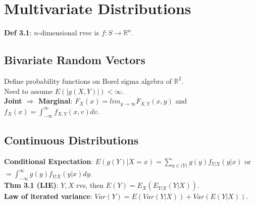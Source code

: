 \section{Multivariate Distributions}
\textbf{Def 3.1}: $n$-dimensional rvec is $f: S \to \mathbb{R}^n$.\\
\subsection{Bivariate Random Vectors}
Define probability functions on Borel sigma algebra of $\mathbb{R}^2$.\\
Need to assume $E(|g(X,Y)|) < \infty$.\\
\textbf{Joint $\Rightarrow$ Marginal}: $F_X(x) = lim_{y\to\infty}F_{X,Y}(x,y)$ and $f_{X}(x) = \int_{-\infty}^\infty f_{X,Y}(x,v)dv$.\\

\subsection{Continuous Distributions}
\textbf{Conditional Expectation}: $E(g(Y)|X=x) = \sum_{y\in\mathbb(Y)}g(y)f_{Y|X}(y|x)$ or $=\int_{-\infty}^\infty g(y)f_{Y|X}(y|x)dy$.\\
\textbf{Thm 3.1 (LIE)}: $Y,X$ rvs, then $E(Y) = E_X(E_{Y|X}(Y|X))$.\\
\textbf{Law of iterated variance}: $Var(Y) = E(Var(Y|X)) + Var(E(Y|X))$.

